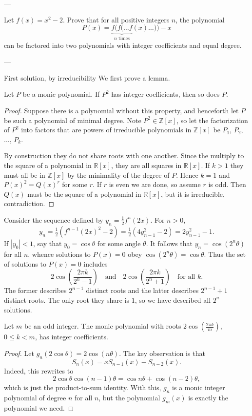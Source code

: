 
---

Let $f(x)=x^2-2$. Prove that for all positive integers $n$, the polynomial \[P(x)=\underbrace{f(f(\ldots f}_{n\text{ times}}(x)\ldots))-x\]
can be factored into two polynomials with integer coefficients and equal degree.

---

\begin{customenv}{First solution, by irreducibility}
    We first prove a lemma.
    \begin{boxlemma*}
        Let $P$ be a monic polynomial. If $P^2$ has integer coefficients, then so does $P$.
    \end{boxlemma*}
    \begin{proof}
        Suppose there is a polynomial without this property, and henceforth let $P$ be such a polynomial of minimal degree. Note $P^2\in\mathbb Z[x]$, so let the factorization of $P^2$ into factors that are powers of irreducible polynomials in $\mathbb Z[x]$ be $P_1$, $P_2$, $\ldots$, $P_k$.

        By construction they do not share roots with one another. Since the multiply to the square of a polynomial in $\mathbb R[x]$, they are all squares in $\mathbb R[x]$. If $k>1$ they must all be in $\mathbb Z[x]$ by the minimality of the degree of $P$. Hence $k=1$ and $P(x)^2=Q(x)^r$ for some $r$. If $r$ is even we are done, so assume $r$ is odd. Then $Q(x)$ must be the square of a polynomial in $\mathbb R[x]$, but it is irreducible, contradiction.
    \end{proof}

    Consider the sequence defined by $y_n=\frac12f^n(2x)$. For $n>0$, \[y_n=\tfrac12(f^{n-1}(2x)^2-2)=\tfrac12(4y_{n-1}^2-2)=2y_{n-1}^2-1.\]
    If $|y_0|<1$, say that $y_0=\cos\theta$ for some angle $\theta$. It follows that $y_n=\cos(2^n\theta)$ for all $n$, whence solutions to $P(x)=0$ obey $\cos(2^n\theta)=\cos\theta$. Thus the set of solutions to $P(x)=0$ includes \[2\cos\left(\frac{2\pi k}{2^n-1}\right)\quad\text{and}\quad2\cos\left(\frac{2\pi k}{2^n+1}\right)\quad\text{for all }k.\]
    The former describes $2^{n-1}$ distinct roots and the latter describes $2^{n-1}+1$ distinct roots. The only root they share is $1$, so we have described all $2^n$ solutions.
    \begin{iclaim*}
        Let $m$ be an odd integer. The monic polynomial with roots $2\cos(\frac{2\pi k}m)$, $0\le k<m$, has integer coefficients.
    \end{iclaim*}
    \begin{proof}
        Let $g_n(2\cos\theta)=2\cos(n\theta)$. The key observation is that \[S_n(x)=xS_{n-1}(x)-S_{n-2}(x).\]
        Indeed, this rewrites to \[2\cos\theta\cos(n-1)\theta=\cos n\theta+\cos(n-2)\theta,\]
        which is just the product-to-sum identity. With this, $g_n$ is a monic integer polynomial of degree $n$ for all $n$, but the polynomial $g_m(x)$ is exactly the polynomial we need.
    \end{proof}


\end{customenv}
